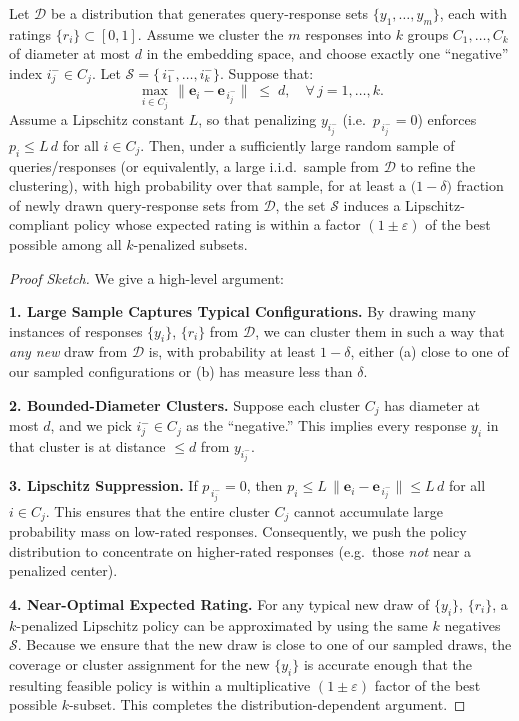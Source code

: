 \begin{theorem}
\label{thm:distribution_coreset_responses}
Let \(\mathcal{D}\) be a distribution that generates query-response sets \(\{y_1,\dots,y_m\}\), each with ratings \(\{r_i\}\subset [0,1]\). Assume we cluster the \(m\) responses into \(k\) groups \(C_1,\dots,C_k\) of diameter at most \(d\) in the embedding space, and choose exactly one ``negative'' index \(i_j^-\in C_j\). Let \(\mathcal{S}=\{\,i_1^-,\dots,i_k^-\}\). Suppose that:
\[
   \max_{i\in C_j}\,
   \|\mathbf{e}_i-\mathbf{e}_{\,i_j^-}\|
   \;\le\;d,
   \quad
   \forall\,j=1,\dots,k.
\]
Assume a Lipschitz constant \(L\), so that penalizing \(y_{i_j^-}\) (i.e.\ \(p_{\,i_j^-}=0\)) enforces \(p_i \le L\,d\) for all \(i\in C_j\). Then, under a sufficiently large random sample of queries/responses (or equivalently, a large i.i.d.\ sample from \(\mathcal{D}\) to refine the clustering), with high probability over that sample, for at least a \(\bigl(1-\delta\bigr)\) fraction of newly drawn query-response sets from \(\mathcal{D}\), the set \(\mathcal{S}\) induces a Lipschitz-compliant policy whose expected rating is within a factor \((1\pm \varepsilon)\) of the best possible among all $k$-penalized subsets.
\end{theorem}

\begin{proof}[Proof Sketch]
We give a high-level argument:

\textbf{1. Large Sample Captures Typical Configurations.} By drawing many instances of responses $\{y_i\}$, $\{r_i\}$ from $\mathcal{D}$, we can cluster them in such a way that \emph{any new} draw from $\mathcal{D}$ is, with probability at least $1-\delta$, either (a) close to one of our sampled configurations or (b) has measure less than $\delta$.

\textbf{2. Bounded-Diameter Clusters.} Suppose each cluster $C_j$ has diameter at most $d$, and we pick $i_j^- \in C_j$ as the ``negative.'' This implies every response $y_i$ in that cluster is at distance $\le d$ from $y_{i_j^-}$.

\textbf{3. Lipschitz Suppression.} If $p_{\,i_j^-}=0$, then $p_i \le L\,\|\mathbf{e}_i - \mathbf{e}_{\,i_j^-}\|\le L\,d$ for all $i \in C_j$. This ensures that the entire cluster $C_j$ cannot accumulate large probability mass on low-rated responses. Consequently, we push the policy distribution to concentrate on higher-rated responses (e.g.\ those \emph{not} near a penalized center).

\textbf{4. Near-Optimal Expected Rating.} For any typical new draw of $\{y_i\}$, $\{r_i\}$, a $k$-penalized Lipschitz policy can be approximated by using the same $k$ negatives $\mathcal{S}$. Because we ensure that the new draw is close to one of our sampled draws, the coverage or cluster assignment for the new $\{y_i\}$ is accurate enough that the resulting feasible policy is within a multiplicative $(1\pm \varepsilon)$ factor of the best possible $k$-subset. This completes the distribution-dependent argument.

\end{proof}

